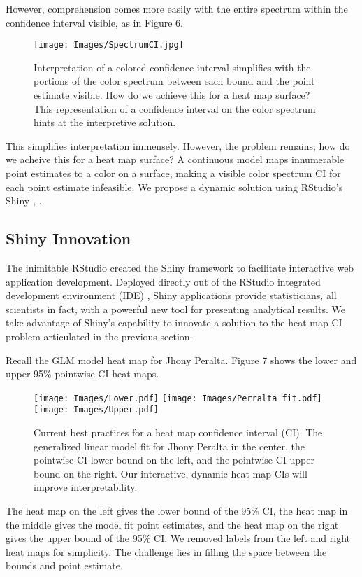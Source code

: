 However, comprehension comes more easily with the entire spectrum within the confidence interval visible, as in Figure 6.
  \begin{figure}[H]
  \centering
	\texttt{[image: Images/SpectrumCI.jpg]}
	\caption{Interpretation of a colored confidence interval simplifies with the portions of the color spectrum between each bound and the point estimate visible. How do we achieve this for a heat map surface? This representation of a confidence interval on the color spectrum hints at the interpretive solution. }
	\end{figure}
This simplifies interpretation immensely. However, the problem remains; how do we acheive this for a heat map surface? A continuous model maps innumerable point estimates to a color on a surface, making a visible color spectrum CI for each point estimate infeasible. We propose a dynamic solution using RStudio's Shiny \citep{Shiny}, \citep{RStudio}.

\subsection{Shiny Innovation}

The inimitable RStudio created the Shiny framework to facilitate interactive web application development. Deployed directly out of the RStudio integrated development environment (IDE) \citep{IDE}, Shiny applications provide statisticians, all scientists in fact, with a powerful new tool for presenting analytical results. We take advantage of Shiny's capability to innovate a solution to the heat map CI problem articulated in the previous section.

Recall the GLM model heat map for Jhony Peralta. Figure 7 shows the lower and upper 95\% pointwise CI heat maps.

  \begin{figure}[H]
	\centering
	\texttt{[image: Images/Lower.pdf]}
	\texttt{[image: Images/Perralta\_fit.pdf]}
	\texttt{[image: Images/Upper.pdf]}
	\caption{Current best practices for a heat map confidence interval (CI). The generalized linear model fit for Jhony Peralta in the center, the pointwise CI lower bound on the left, and the pointwise CI upper bound on the right. Our interactive, dynamic heat map CIs will improve interpretability.}
	\end{figure}
The heat map on the left gives the lower bound of the 95\% CI, the heat map in the middle gives the model fit point estimates, and the heat map on the right gives the upper bound of the 95\% CI. We removed labels from the left and right heat maps for simplicity. The challenge lies in filling the space between the bounds and point estimate.

